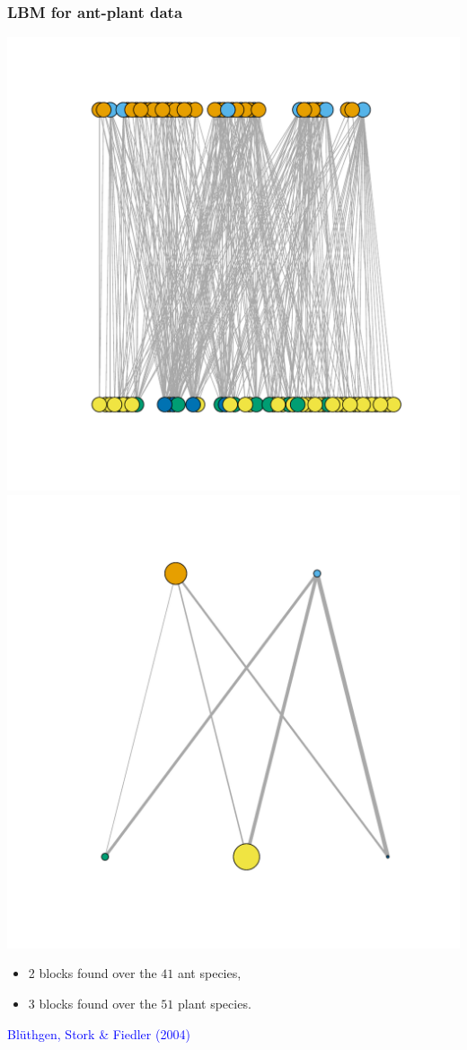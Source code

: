 \documentclass[nopagenumber,9pt]{beamer}
\begin{document}
\begin{frame}
 \frametitle{LBM for ant-plant data}
 
 \begin{center}
  \includegraphics[scale=.3]{plots/bluthgen.pdf}
  \includegraphics[scale=.3]{plots/bluthgen_sum.pdf}
 \end{center}

 \begin{itemize}
  \item 2 blocks found over the $41$ ant species,
  \item 3 blocks found over the $51$ plant species.
 \end{itemize}

\textcolor{blue}{Blüthgen, Stork \& Fiedler (2004)}

\end{frame}
\end{document}
